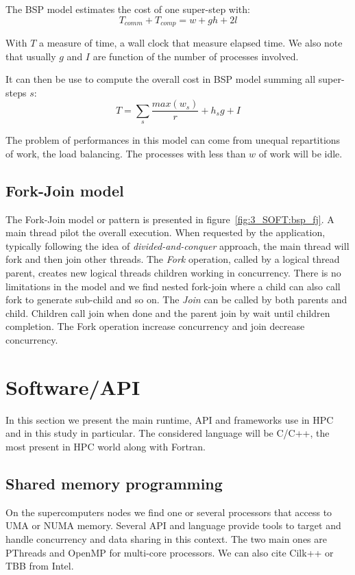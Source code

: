 The BSP model estimates the cost of one super-step with: 
\begin{equation}
  T_{comm} + T_{comp} = w + gh + 2l
\end{equation}

With $T$ a measure of time, a wall clock that measure elapsed time. 
We also note that usually $g$ and $I$ are function of the number of processes involved. 

It can then be use to compute the overall cost in BSP model summing all super-steps $s$: 
\begin{equation}
T = \sum_s \frac{max (w_s)}{r} + h_sg + I
\end{equation}

The problem of performances in this model can come from unequal repartitions of work, the load balancing. 
The processes with less than $w$ of work will be idle. 

\subsection{Fork-Join model}
The Fork-Join model or pattern is presented in figure~\ref{fig:3_SOFT:bsp_fj}.
A main thread pilot the overall execution. 
When requested by the application, typically following the idea of \textit{divided-and-conquer} approach, the main thread will fork and then join other threads. 
The \textit{Fork} operation, called by a logical thread parent, creates new logical threads children working in concurrency.
There is no limitations in the model and we find nested fork-join where a child can also call fork to generate sub-child and so on. 
The \textit{Join} can be called by both parents and child. Children call join when done and the parent join by wait until children completion.
The Fork operation increase concurrency and join decrease concurrency.

\section{Software/API}
In this section we present the main runtime, API and frameworks use in HPC and in this study in particular. 
The considered language will be C/C++, the most present in HPC world along with Fortran. 

\subsection{Shared memory programming}
On the supercomputers nodes we find one or several processors that access to UMA or NUMA memory. 
Several API and language provide tools to target and handle concurrency and data sharing in this context. 
The two main ones are PThreads and OpenMP for multi-core processors. 
We can also cite Cilk++ or TBB from Intel.

